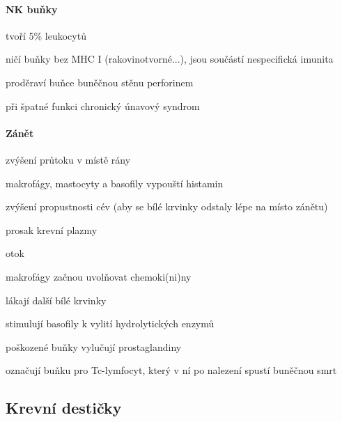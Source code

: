 \documentclass[DIV=8]{scrreprt}
\begin{document}
\paragraph{NK buňky}
\begin{myItemize}[nosep]
    \item tvoří 5\% leukocytů
    \item ničí buňky bez MHC I (rakovinotvorné...), jsou součástí nespecifická imunita
    \item proděraví buňce buněčnou stěnu perforinem
    \item při špatné funkci chronický únavový syndrom
\end{myItemize}




\paragraph{Zánět}
\begin{myItemize}[nosep]
    \item zvýšení průtoku v místě rány
    \item makrofágy, mastocyty a basofily vypouští histamin
\begin{myItemize}[nosep]
    \item zvýšení propustnosti cév (aby se bílé krvinky odstaly lépe na místo zánětu)
    \item prosak krevní plazmy
    \item otok
\end{myItemize}

    \item makrofágy začnou uvolňovat chemoki(ni)ny
\begin{myItemize}[nosep]
    \item lákají další bílé krvinky
    \item stimulují basofily k vylití hydrolytických enzymů
\end{myItemize}

    \item poškozené buňky vylučují prostaglandiny
\begin{myItemize}[nosep]
    \item označují buňku pro Tc-lymfocyt, který v ní po nalezení spustí buněčnou smrt
\end{myItemize}

\end{myItemize}



\subsection{Krevní destičky} \label{Krevní destičky}
\end{document}
